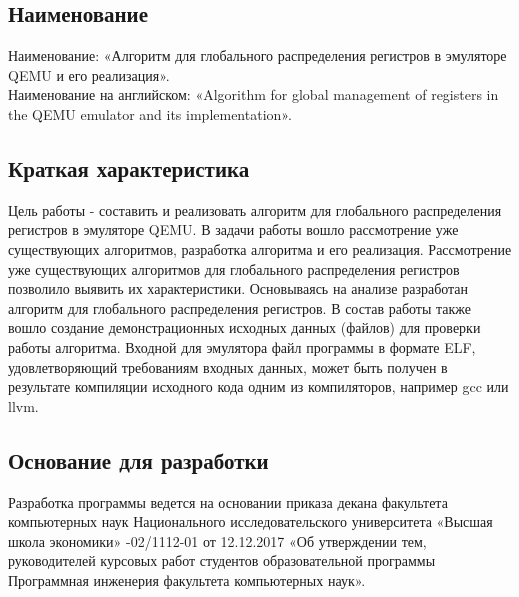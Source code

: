 \subsection{Наименование}
Наименование: «Алгоритм для глобального распределения регистров в эмуляторе QEMU и его реализация». \\
Наименование на английском: «Algorithm for global management of registers in the QEMU emulator and its implementation». \\

\subsection{Краткая характеристика}
    Цель работы - составить и реализовать алгоритм для глобального распределения регистров в эмуляторе QEMU.
    В задачи работы вошло рассмотрение уже существующих алгоритмов, разработка алгоритма и его реализация.
    Рассмотрение уже существующих алгоритмов для глобального распределения регистров позволило выявить их характеристики. Основываясь на анализе разработан алгоритм для глобального распределения регистров.
    В состав работы также вошло создание демонстрационных исходных данных (файлов) для проверки работы алгоритма. Входной для эмулятора файл программы в формате ELF, удовлетворяющий требованиям входных данных, может быть получен в результате компиляции исходного кода одним из компиляторов, например gcc или llvm.

\subsection{Основание для разработки}
Разработка программы ведется на основании приказа декана факультета компьютерных наук
Национального исследовательского университета «Высшая школа экономики» 
-02/1112-01 от 12.12.2017
«Об  утверждении  тем,  руководителей  курсовых  работ  студентов
образовательной  программы  Программная  инженерия 
факультета 
компьютерных наук».